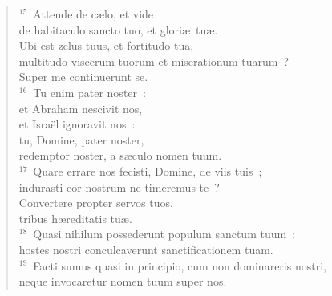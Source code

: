 \begin{verse}
${}^{15}$~Attende de c\ae lo, et vide\\ de habitaculo sancto tuo, et glori\ae\ tu\ae .\\ Ubi est zelus tuus, et fortitudo tua,\\ multitudo viscerum tuorum et miserationum tuarum~?\\ Super me continuerunt se.\\
${}^{16}$~Tu enim pater noster~:\\ et Abraham nescivit nos,\\ et Isra\"el ignoravit nos~:\\ tu, Domine, pater noster,\\ redemptor noster, a s\ae culo nomen tuum.\\
${}^{17}$~Quare errare nos fecisti, Domine, de viis tuis~;\\ indurasti cor nostrum ne timeremus te~?\\ Convertere propter servos tuos,\\ tribus h\ae reditatis tu\ae .\\
${}^{18}$~Quasi nihilum possederunt populum sanctum tuum~:\\ hostes nostri conculcaverunt sanctificationem tuam.\\
${}^{19}$~Facti sumus quasi in principio, cum non dominareris nostri,\\ neque invocaretur nomen tuum super nos.\end{verse}


